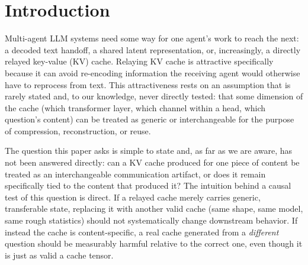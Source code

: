 \documentclass[11pt]{article}
\begin{document}
\begin{abstract}
quantization preserves accuracy at no measurable cost; naive uniform
4-bit quantization collapses to incoherent output; a rotation-based
4-bit scheme fails for a diagnosable reason, disrupting the
position-dependent structure rotary position embeddings (RoPE) impose on
cached keys; a KIVI-inspired per-channel fix for keys resolves this,
reaching 3.96x compression at accuracy statistically indistinguishable
from our strongest layer-selection configuration (McNemar $p=0.86$); and
an anchor-based offset-correction mechanism adapted from KVCOMM
\citep{kvcomm2025} fails outright. Throughout, we report paired
significance tests and bootstrap confidence intervals, and we are
explicit about where our evidence is strongest (the fan-in topology, the
cross-architecture Qwen3-8B exception) and where it remains open (the
model-driven topology's KV-versus-text accuracy comparison, and a
single-GPU evaluation whose compression ratios do not constitute a
measured network-latency speedup).
\end{abstract}

\section{Introduction}

Multi-agent LLM systems need some way for one agent's work to reach the
next: a decoded text handoff, a shared latent representation, or,
increasingly, a directly relayed key-value (KV) cache. Relaying KV cache
is attractive specifically because it can avoid re-encoding information
the receiving agent would otherwise have to reprocess from text. This
attractiveness rests on an assumption that is rarely stated and, to our
knowledge, never directly tested: that some dimension of the cache
(which transformer layer, which channel within a head, which question's
content) can be treated as generic or interchangeable for the purpose of
compression, reconstruction, or reuse.

The question this paper asks is simple to state and, as far as we are
aware, has not been answered directly: can a KV cache produced for one
piece of content be treated as an interchangeable communication artifact,
or does it remain specifically tied to the content that produced it? The
intuition behind a causal test of this question is direct. If a relayed
cache merely carries generic, transferable state, replacing it with
another valid cache (same shape, same model, same rough statistics)
should not systematically change downstream behavior. If instead the
cache is content-specific, a real cache generated from a \emph{different}
question should be measurably harmful relative to the correct one, even
though it is just as valid a cache tensor.
\end{document}
